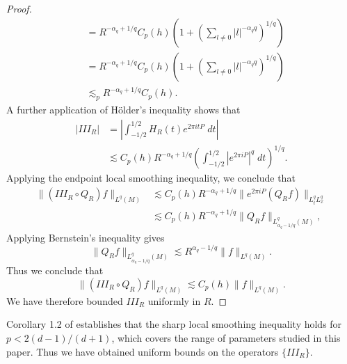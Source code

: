 \begin{proof}
\begin{align*}
        &= R^{-\alpha_q + 1/q} C_p(h) \left( 1 + \left( \sum_{l \neq 0} |l|^{-\alpha_q q} \right)^{1/q} \right)\\
        &= R^{-\alpha_q + 1/q} C_p(h) \left( 1 + \left( \sum_{l \neq 0} |l|^{- \alpha_q q} \right)^{1/q} \right) \\
        &\lesssim_p R^{-\alpha_q + 1/q} C_p(h).
    \end{align*}
    A further application of H\"{o}lder's inequality shows that
    \begin{align*}
        | III_R | &= \left| \int_{-1/2}^{1/2} H_R(t) e^{2 \pi i t P}\; dt \right|\\
        &\lesssim C_p(h) R^{-\alpha_q + 1/q} \left( \int_{-1/2}^{1/2} |e^{2 \pi i P}|^{q}\; dt \right)^{1/q}.
    \end{align*}
    Applying the endpoint local smoothing inequality, we conclude that
    \begin{align*}
        \| (III_R \circ Q_R)f \|_{L^{q}(M)} &\lesssim C_p(h) R^{-\alpha_q + 1/q} \| e^{2 \pi i P} (Q_R f) \|_{L^{q}_t L^{q}_x}\\
        &\lesssim C_p(h) R^{-\alpha_q + 1/q} \| Q_R f \|_{L^{q}_{\alpha_q - 1/q}(M)},
    \end{align*}
    Applying Bernstein's inequality gives
    \[ \| Q_R f \|_{L^{q}_{\alpha_q - 1/q}(M)} \lesssim R^{\alpha_q - 1/q} \| f \|_{L^q(M)}. \]
    Thus we conclude that
    \[ \| (III_R \circ Q_R) f \|_{L^{q}(M)} \lesssim C_p(h) \| f \|_{L^{q}(M)}. \]
    We have therefore bounded $III_R$ uniformly in $R$.
\end{proof}

Corollary 1.2 of \cite{LeeSeeger} establishes that the sharp local smoothing inequality holds for $p < 2(d-1)/(d+1)$, which covers the range of parameters studied in this paper. Thus we have obtained uniform bounds on the operators $\{ III_R \}$.

